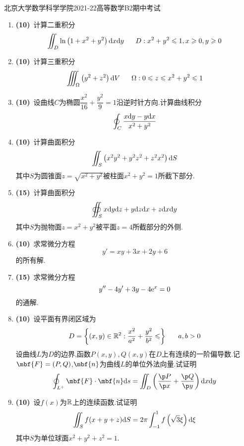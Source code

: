 \documentclass{ctexart}
\begin{document}
\pagestyle{empty}
\begin{center}\Large
    北京大学数学科学学院2021-22高等数学B2期中考试
\end{center}
\begin{enumerate}[leftmargin=*,label=\textbf{\arabic*.}]
    \item \textbf{(10)}\ 计算二重积分
        \[\iint_{D}\ln\left(1+x^2+y^2\right)\dx\di y\ \ \ \ \ D:x^2+y^2\leqslant1,x\geqslant0,y\geqslant0\]
    \item \textbf{(10)}\ 计算三重积分
        \[\iiint_{\Omega}\left(y^2+z^2\right)\di V\ \ \ \ \ \Omega:0\leqslant z\leqslant x^2+y^2\leqslant1\]
    \item \textbf{(10)}\ 设曲线$C$为椭圆$\dfrac{x^2}{16}+\dfrac{y^2}{9}=1$沿逆时针方向.计算曲线积分
        \[\oint_{C}\dfrac{x\mathrm{d} y-y\mathrm{d} x}{x^2+y^2}\]
    \item \textbf{(10)}\ 计算曲面积分
        \[\iint_{S}\left(x^2y^2+y^2z^2+z^2x^2\right)\mathrm{d} S\]
        其中$S$为圆锥面$z=\sqrt{x^2+y^2}$被柱面$x^2+y^2=1$所截下部分.
    \item \textbf{(15)}\ 计算曲面积分
        \[\oiint_Sx\mathrm{d} y\mathrm{d} z+y\mathrm{d} z\mathrm{d} x+z\mathrm{d} x\mathrm{d} y\]
        其中$S$为抛物面$z=x^2+y^2$被平面$z=4$所截部分的外侧.
    \item \textbf{(10)}\ 求常微分方程
        \[y'=xy+3x+2y+6\]
        的所有解.
    \item \textbf{(15)}\ 求常微分方程
        \[y''-4y'+3y-4\mathrm{e}^x=0\]
        的通解.
    \item \textbf{(10)}\ 设平面有界闭区域为
        \[D=\left\{(x,y)\in\R^2:\dfrac{x^2}{a^2}+\dfrac{y^2}{b^2}\leqslant\right\}\ \ \ \ \ a,b>0\]
        设曲线$L$为$D$的边界,函数$P(x,y),Q(x,y)$在$D$上有连续的一阶偏导数.记$\mbf{F}=(P,Q)$,$\mbf{n}$为曲线$L$的单位外法向量.试证明
        \[\oint_{L^+}\mbf{F}\cdot\mbf{n}\di s=\iint_{D}\left(\dfrac{\p P}{\p x}+\dfrac{\p Q}{\p y}\right)\di x\di y\]
    \item \textbf{(10)}\ 设$f(x)$为$\mathbb{R}$上的连续函数.试证明
        \[\iint_{S}f(x+y+z)\mathrm{d} S=2\pi\int_{-1}^{1}f\left(\sqrt{3}\xi\right)\mathrm{d}\xi\]
        其中$S$为单位球面$x^2+y^2+z^2=1$.
\end{enumerate}
\end{document}
